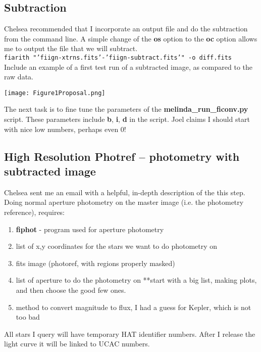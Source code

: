 
\subsection*{Subtraction}
Chelsea recommended that I incorporate an output file and do the subtraction from the command line. A simple change of the \textbf{os} option to the \textbf{oc} option allows me to output the file that we will subtract. \\
\texttt{fiarith "'fiign-xtrns.fits'-'fiign-subtract.fits'" -o diff.fits}\\
Include an example of a first test run of a subtracted image, as compared to the raw data.
\begin{center}
\texttt{[image: Figure1Proposal.png]}
\end{center}

The next task is to fine tune the parameters of the \textbf{melinda\_run\_ficonv.py} script. These parameters include \textbf{b}, \textbf{i}, \textbf{d} in the script. Joel claims I should start with nice low numbers, perhaps even 0! 

\subsection*{High Resolution Photref -- photometry with subtracted image}
Chelsea sent me an email with a helpful, in-depth description of the this step.\\  

Doing normal aperture photometry on the master image (i.e. the photometry reference), requires: 
\begin{enumerate}
\item \textbf{fiphot} - program used for aperture photometry
\item list of x,y coordinates for the stars we want to do photometry on 
\item fits image (photoref, with regions properly masked)
\item list of aperture to do the photometry on **start with a big list, making plots, and then choose the good few ones. 
\item method to convert magnitude to flux, I had a guess for Kepler, which is not too bad 
\end{enumerate}

All stars I query will have temporary HAT identifier numbers. 
After I release the light curve it will be linked to UCAC numbers.

